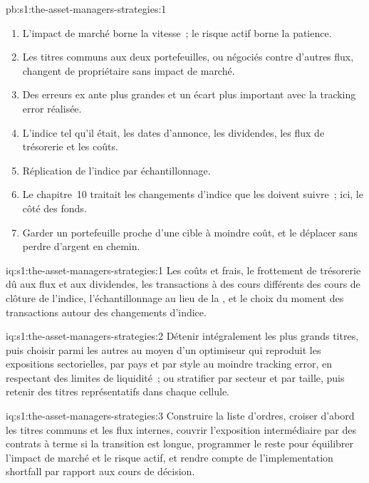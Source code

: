 \begin{solution}{pb:s1:the-asset-managers-strategies:1}
\begin{enumerate}
titres~; la transition de 59~\% d'un fonds de 2~milliards de dollars coûte 27.6 points de base en un jour ($\pm$21.8) et 18.5 en trois jours ($\pm$27.2), avec le coût plus un
écart-type minimal à deux ou trois jours (45.6).
\item L'impact de marché borne la vitesse~; le risque actif borne la patience.
\item Les titres communs aux deux portefeuilles, ou négociés contre d'autres flux, changent de propriétaire sans impact de marché.
\item Des erreurs ex ante plus grandes et un écart plus important avec la tracking error réalisée.
\item L'indice tel qu'il était, les dates d'annonce, les dividendes, les flux de trésorerie et les coûts.
\item Réplication de l'indice par échantillonnage.
\item Le chapitre~10 traitait les changements d'indice que les  doivent suivre~; ici, le côté des fonds.
\item Garder un portefeuille proche d'une cible à moindre coût, et le déplacer sans perdre d'argent en chemin.
\end{enumerate}
\end{solution}

\begin{solution}{iq:s1:the-asset-managers-strategies:1}
Les coûts et frais, le frottement de trésorerie dû aux flux et aux dividendes, les transactions à des cours différents des cours de clôture de l'indice, l'échantillonnage au lieu de la , et
le choix du moment des transactions autour des changements d'indice.
\end{solution}

\begin{solution}{iq:s1:the-asset-managers-strategies:2}
Détenir intégralement les plus grands titres, puis choisir parmi les autres au moyen d'un optimiseur qui reproduit les expositions sectorielles, par pays et par style au moindre tracking error,
en respectant des limites de liquidité~; ou stratifier par secteur et par taille, puis retenir des titres représentatifs dans chaque cellule.
\end{solution}

\begin{solution}{iq:s1:the-asset-managers-strategies:3}
Construire la liste d'ordres, croiser d'abord les titres communs et les flux internes, couvrir l'exposition intermédiaire par des contrats à terme si la transition est longue, programmer le reste pour
équilibrer l'impact de marché et le risque actif, et rendre compte de l'implementation shortfall par rapport aux cours de décision.
\end{solution}

